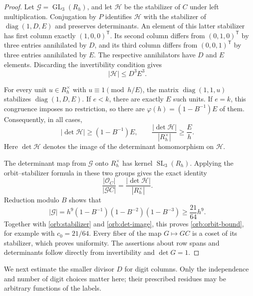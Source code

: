 \begin{proof}
Let $\mathcal G=\operatorname{GL}_3(R_h)$, and let $\mathcal H$ be the
stabilizer of $C$ under left multiplication.  Conjugation by $P$ identifies
$\mathcal H$ with the stabilizer of $\operatorname{diag}(1,D,E)$ and
preserves determinants.  An element of this latter stabilizer has first
column exactly $(1,0,0)^{\mathsf T}$.  Its second column differs from
$(0,1,0)^{\mathsf T}$ by three entries annihilated by $D$, and its third
column differs from $(0,0,1)^{\mathsf T}$ by three entries annihilated by
$E$.  The respective annihilators have $D$ and $E$ elements.  Discarding
the invertibility condition gives
\begin{equation}
 |\mathcal H|\leq D^3E^3.
 \label{orb:stabilizer}
\end{equation}

For every unit $u\in R_h^\times$ with
$u\equiv1\pmod{h/E}$, the matrix $\operatorname{diag}(1,1,u)$
stabilizes $\operatorname{diag}(1,D,E)$.  If $e<k$, there are exactly
$E$ such units.  If $e=k$, this congruence imposes no restriction, so
there are $\varphi(h)=(1-B^{-1})E$ of them.  Consequently, in all cases,
\begin{equation}
 |\det\mathcal H|\geq (1-B^{-1})E,
 \qquad
 \frac{|\det\mathcal H|}{|R_h^\times|}\geq\frac Eh.
 \label{orb:det-image}
\end{equation}
Here $\det\mathcal H$ denotes the image of the determinant homomorphism
on $\mathcal H$.

The determinant map from $\mathcal G$ onto $R_h^\times$ has kernel
$\operatorname{SL}_3(R_h)$.  Applying the orbit--stabilizer formula in
these two groups gives the exact identity
\[
 \frac{|\mathcal O_C|}{|\mathcal G C|}
 =\frac{|\det\mathcal H|}{|R_h^\times|}.
\]
Reduction modulo $B$ shows that
\[
 |\mathcal G|
 =h^9(1-B^{-1})(1-B^{-2})(1-B^{-3})
 \geq\frac{21}{64}h^9.
\]
Together with \eqref{orb:stabilizer} and \eqref{orb:det-image}, this proves
\eqref{orb:orbit-bound}, for example with $c_0=21/64$.
Every fiber of the map $G\mapsto GC$ is a coset of its stabilizer, which
proves uniformity.  The assertions about row spans and determinants
follow directly from invertibility and $\det G=1$.
\end{proof}

We next estimate the smaller divisor $D$ for digit columns.  Only the
independence and number of digit choices matter here; their prescribed
residues may be arbitrary functions of the labels.

